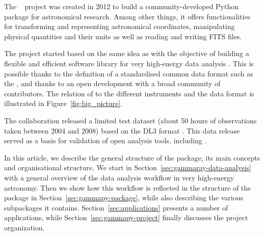 \documentclass[traditabstract, longauth]{aa}
\begin{document}
The \astropy~\citep{astropy} project was created in 2012 to build a community-developed
Python package for astronomical research. Among other things, it offers functionalities for
transforming and representing astronomical coordinates, manipulating physical quantities
and their units as well as reading and writing FITS files.

The \gammapy project started based on the same idea as \astropuy with the objective of building a flexible and
efficient software library for very high-energy \gammaray data analysis \citep{gammapy_2015}.
This is possible thanks to the definition of a standardised common data format such as the \gadf, and thanks to
an open development with a broad community of contributors. The relation of \gammapy to the
different instruments and the \gadf data format is illustrated in Figure~\ref{fig:big_picture}.


The \hess collaboration released a limited test dataset (about 50 hours of
observations taken between 2004 and 2008) based  on the \gadf DL3 format \citep{HESS_DR1}.
This data release served as a basis for validation of open analysis tools,
including \gammapy \cite[see e.g.][]{Mohrmann2019}.

In this article, we describe the general structure of the \gammapy package,
its main concepts and organisational structure. We start in
Section~\ref{sec:gammaray-data-analysis} with a general overview
of the data analysis workflow in very high-energy \gammaray astronomy. Then we
show how this workflow is reflected in the structure of the \gammapy package 
in Section~\ref{sec:gammapy-package}, while also
describing the various subpackages it contains. Section~\ref{sec:applications}
presents a number of applications, while Section~\ref{sec:gammapy-project}
finally discusses the project organization.
\end{document}
